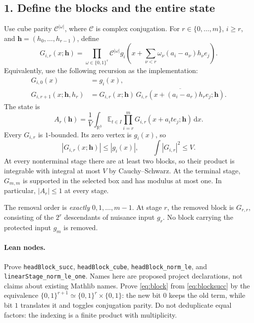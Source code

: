 \documentclass[11pt]{article}
\newcommand{\R}{\mathbb R}
\newcommand{\E}{\mathbb E}
\newcommand{\CC}{\mathcal C}
\newcommand{\dd}{\,\mathrm d}
\newcommand{\idname}[1]{\nolinkurl{#1}}
\theoremstyle{definition}\newtheorem{definition}[lemma]{Definition}
\begin{document}
\subsection*{1. Define the blocks and the entire state}
Use cube parity $\CC^{|\omega|}$, where $\CC$ is complex conjugation. For $r\in\{0,\ldots,m\}$, $i\geq r$, and $\mathbf h=(h_0,\ldots,h_{r-1})$, define
\begin{equation}\label{eq:block}
 G_{i,r}(x;\mathbf h)
 =\prod_{\omega\in\{0,1\}^r}\CC^{|\omega|}
    g_i\!\left(x+\sum_{\nu<r}
        \omega_\nu(a_i-a_\nu)h_\nu e_j\right).
\end{equation}
Equivalently, use the following recursion as the implementation:
\begin{align}
 G_{i,0}(x)&=g_i(x),\label{eq:blockzero}\\
 G_{i,r+1}(x;\mathbf h,h_r)
 &=G_{i,r}(x;\mathbf h)\,
   \overline{G_{i,r}(x+(a_i-a_r)h_r e_j;\mathbf h)}.
 \label{eq:blocksucc}
\end{align}
The state is
\begin{equation}\label{eq:state}
 A_r(\mathbf h)=\frac1V\int_{\R^3}\E_{t\in I}
       \prod_{i=r}^m G_{i,r}(x+a_i t e_j;\mathbf h)\dd x.
\end{equation}
Every $G_{i,r}$ is $1$-bounded. Its zero vertex is $g_i(x)$, so
\[
 |G_{i,r}(x;\mathbf h)|\leq |g_i(x)|,
 \qquad \int |G_{i,r}|^2\leq V.
\]
At every nonterminal stage there are at least two blocks, so their product is integrable with integral at most $V$ by Cauchy--Schwarz. At the terminal stage, $G_{m,m}$ is supported in the selected box and has modulus at most one. In particular, $|A_r|\leq1$ at every stage.

The removal order is \emph{exactly} $0,1,\ldots,m-1$. At stage $r$, the removed block is $G_{r,r}$, consisting of the $2^r$ descendants of nuisance input $g_r$. No block carrying the protected input $g_m$ is removed.

\paragraph{Lean nodes.}
Prove \idname{headBlock_succ}, \idname{headBlock_cube}, \idname{headBlock_norm_le}, and \idname{linearStage_norm_le_one}. Names here are proposed project declarations, not claims about existing Mathlib names. Prove \eqref{eq:block} from \eqref{eq:blocksucc} by the equivalence
$\{0,1\}^{r+1}\simeq\{0,1\}^r\times\{0,1\}$: the new bit $0$ keeps the old term, while bit $1$ translates it and toggles conjugation parity. Do not deduplicate equal factors: the indexing is a finite product with multiplicity.
\end{document}
